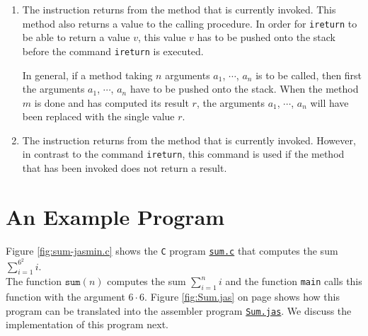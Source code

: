 \begin{enumerate}
      Before the command \texttt{invokestatic} is executed, we have to put the arguments of the method
      onto the stack.  For example, if we want to invoke the method \texttt{sum} described  above, then we
      have to push an integer $n$ onto the stack.  After the method returns, this integer is replaced with the
      return value $\mathtt{sum}(n)$.
\item The instruction 
      returns from the method that is currently invoked.  This method also returns a value to the calling
      procedure.  In order for \texttt{ireturn} to be able to return a value $v$, this value $v$ has to be
      pushed onto the stack before the command \texttt{ireturn} is executed.

      In general, if a method taking $n$ arguments $a_1$, $\cdots$, $a_n$ is to be called, then first the
      arguments $a_1$, $\cdots$, $a_n$ have to be pushed onto the stack.  When the method $m$ is done and
      has computed its result $r$, the arguments $a_1$, $\cdots$, $a_n$ will have been replaced with the
      single value $r$.
\item The instruction 
      returns from the method that is currently invoked.  However, in contrast to the command
      \texttt{ireturn}, this command is used if the method that has been invoked  does not return a result. 
\end{enumerate}

\section{An Example Program}
Figure \ref{fig:sum-jasmin.c} shows the \texttt{C} program 
\href{https://github.com/karlstroetmann/Formal-Languages/tree/master/Python/Chapter-12/sum.c}{\texttt{sum.c}}
that computes the sum
\\[0.2cm]
\hspace*{1.3cm}
$\sum\limits_{i=1}^{6^2} i$.
\\[0.2cm]
The function $\mathtt{sum}(n)$ computes the sum $\sum_{i=1}^{n} i$ and the function
\texttt{main} calls this function with the argument $6 \cdot 6$.  Figure \ref{fig:Sum.jas} on page
\pageref{fig:Sum.jas} shows how this program can be translated 
into the assembler program 
\href{https://github.com/karlstroetmann/Formal-Languages/tree/master/Python/Chapter-12/Sum.jas}{\texttt{Sum.jas}}.
We discuss the implementation of this program next. 


